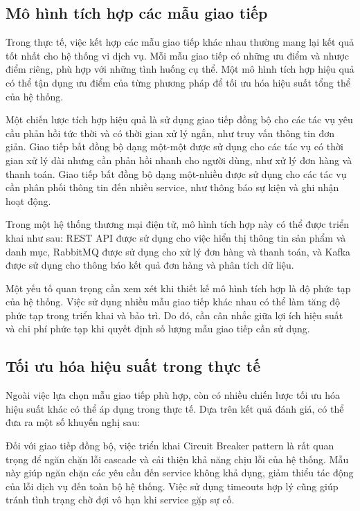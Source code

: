\subsection{Mô hình tích hợp các mẫu giao tiếp}
Trong thực tế, việc kết hợp các mẫu giao tiếp khác nhau thường mang lại kết quả tốt nhất cho hệ thống vi dịch vụ. Mỗi mẫu giao tiếp có những ưu điểm và nhược điểm riêng, phù hợp với những tình huống cụ thể. Một mô hình tích hợp hiệu quả có thể tận dụng ưu điểm của từng phương pháp để tối ưu hóa hiệu suất tổng thể của hệ thống.

Một chiến lược tích hợp hiệu quả là sử dụng giao tiếp đồng bộ cho các tác vụ yêu cầu phản hồi tức thời và có thời gian xử lý ngắn, như truy vấn thông tin đơn giản. Giao tiếp bất đồng bộ dạng một-một được sử dụng cho các tác vụ có thời gian xử lý dài nhưng cần phản hồi nhanh cho người dùng, như xử lý đơn hàng và thanh toán. Giao tiếp bất đồng bộ dạng một-nhiều được sử dụng cho các tác vụ cần phân phối thông tin đến nhiều service, như thông báo sự kiện và ghi nhận hoạt động.

Trong một hệ thống thương mại điện tử, mô hình tích hợp này có thể được triển khai như sau: REST API được sử dụng cho việc hiển thị thông tin sản phẩm và danh mục, RabbitMQ được sử dụng cho xử lý đơn hàng và thanh toán, và Kafka được sử dụng cho thông báo kết quả đơn hàng và phân tích dữ liệu.

Một yếu tố quan trọng cần xem xét khi thiết kế mô hình tích hợp là độ phức tạp của hệ thống. Việc sử dụng nhiều mẫu giao tiếp khác nhau có thể làm tăng độ phức tạp trong triển khai và bảo trì. Do đó, cần cân nhắc giữa lợi ích hiệu suất và chi phí phức tạp khi quyết định số lượng mẫu giao tiếp cần sử dụng.

\subsection{Tối ưu hóa hiệu suất trong thực tế}
Ngoài việc lựa chọn mẫu giao tiếp phù hợp, còn có nhiều chiến lược tối ưu hóa hiệu suất khác có thể áp dụng trong thực tế. Dựa trên kết quả đánh giá, có thể đưa ra một số khuyến nghị sau:

Đối với giao tiếp đồng bộ, việc triển khai Circuit Breaker pattern là rất quan trọng để ngăn chặn lỗi cascade và cải thiện khả năng chịu lỗi của hệ thống. Mẫu này giúp ngăn chặn các yêu cầu đến service không khả dụng, giảm thiểu tác động của lỗi dịch vụ đến toàn bộ hệ thống. Việc sử dụng timeouts hợp lý cũng giúp tránh tình trạng chờ đợi vô hạn khi service gặp sự cố.

